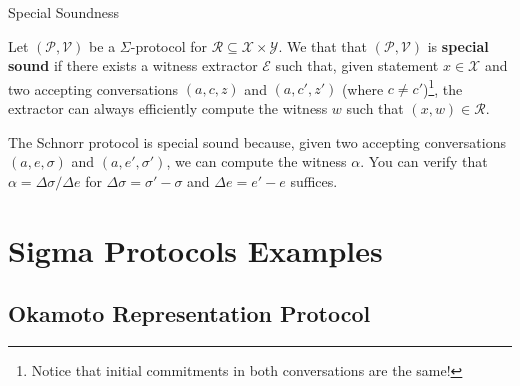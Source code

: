 \documentclass[xcolor={usenames,dvipsnames}]{beamer}
\begin{document}
    \begin{frame}{Special Soundness}
        \begin{definition}
            Let $(\mathcal{P}, \mathcal{V})$ be a $\Sigma$-protocol for $\mathcal{R} \subseteq \mathcal{X} \times \mathcal{Y}$. We that that $(\mathcal{P},\mathcal{V})$ is \textbf{special sound} if there exists a witness extractor $\mathcal{E}$ such that, given statement $x \in \mathcal{X}$ and two accepting conversations $(a,c,z)$ and $(a,c',z')$ (where $c \neq c'$)\footnote{Notice that initial commitments in both conversations are the same!}, the extractor can always efficiently compute the witness $w$ such that $(x,w) \in \mathcal{R}$.\pause
        \end{definition}

        \begin{example}
            The Schnorr protocol is special sound because, given two accepting conversations $(a,e,\sigma)$ and $(a,e',\sigma')$, we can compute the witness $\alpha$. You can verify that $\alpha = \Delta \sigma / \Delta e$ for $\Delta \sigma = \sigma' - \sigma$ and $\Delta e = e' - e$ suffices.
        \end{example}
    \end{frame}

    \section{Sigma Protocols Examples}
    \subsection{Okamoto Representation Protocol}
\end{document}
